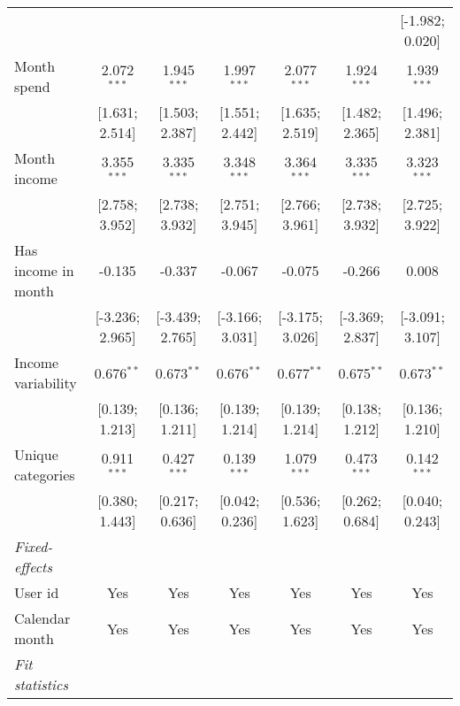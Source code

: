 \begin{table}[htbp]
\begin{threeparttable}[b]
\begin{tabular}{lcccccc}
                                        &                 &                 &                 &                 &                 & [-1.982; 0.020]\\   
         Month spend                    & 2.072$^{***}$   & 1.945$^{***}$   & 1.997$^{***}$   & 2.077$^{***}$   & 1.924$^{***}$   & 1.939$^{***}$\\   
                                        & [1.631; 2.514]  & [1.503; 2.387]  & [1.551; 2.442]  & [1.635; 2.519]  & [1.482; 2.365]  & [1.496; 2.381]\\   
         Month income                   & 3.355$^{***}$   & 3.335$^{***}$   & 3.348$^{***}$   & 3.364$^{***}$   & 3.335$^{***}$   & 3.323$^{***}$\\   
                                        & [2.758; 3.952]  & [2.738; 3.932]  & [2.751; 3.945]  & [2.766; 3.961]  & [2.738; 3.932]  & [2.725; 3.922]\\   
         Has income in month            & -0.135          & -0.337          & -0.067          & -0.075          & -0.266          & 0.008\\   
                                        & [-3.236; 2.965] & [-3.439; 2.765] & [-3.166; 3.031] & [-3.175; 3.026] & [-3.369; 2.837] & [-3.091; 3.107]\\   
         Income variability             & 0.676$^{**}$    & 0.673$^{**}$    & 0.676$^{**}$    & 0.677$^{**}$    & 0.675$^{**}$    & 0.673$^{**}$\\   
                                        & [0.139; 1.213]  & [0.136; 1.211]  & [0.139; 1.214]  & [0.139; 1.214]  & [0.138; 1.212]  & [0.136; 1.210]\\   
         Unique categories              & 0.911$^{***}$   & 0.427$^{***}$   & 0.139$^{***}$   & 1.079$^{***}$   & 0.473$^{***}$   & 0.142$^{***}$\\   
                                        & [0.380; 1.443]  & [0.217; 0.636]  & [0.042; 0.236]  & [0.536; 1.623]  & [0.262; 0.684]  & [0.040; 0.243]\\   
         \midrule
         \emph{Fixed-effects}\\
         User id                        & Yes             & Yes             & Yes             & Yes             & Yes             & Yes\\  
         Calendar month                 & Yes             & Yes             & Yes             & Yes             & Yes             & Yes\\  
         \midrule
         \emph{Fit statistics}\\

\end{tabular}
\end{threeparttable}
\end{table}
